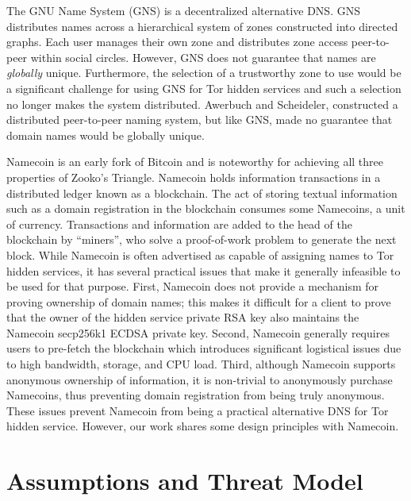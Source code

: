 \documentclass[conference]{IEEEtran}
\begin{document}
The GNU Name System\cite{wachs2014censorship} (GNS) is a decentralized alternative DNS. GNS distributes names across a hierarchical system of zones constructed into directed graphs. Each user manages their own zone and distributes zone access peer-to-peer within social circles. However, GNS does not guarantee that names are \emph{globally} unique. Furthermore, the selection of a trustworthy zone to use would be a significant challenge for using GNS for Tor hidden services and such a selection no longer makes the system distributed. Awerbuch and Scheideler,\cite{awerbuch2004group} constructed a distributed peer-to-peer naming system, but like GNS, made no guarantee that domain names would be globally unique.


Namecoin\cite{NamecoinHome} is an early fork of Bitcoin\cite{nakamoto2008bitcoin} and is noteworthy for achieving all three properties of Zooko's Triangle. Namecoin holds information transactions in a distributed ledger known as a blockchain. The act of storing textual information such as a domain registration in the blockchain consumes some Namecoins, a unit of currency. Transactions and information are added to the head of the blockchain by ``miners'', who solve a proof-of-work problem to generate the next block. While Namecoin is often advertised as capable of assigning names to Tor hidden services, it has several practical issues that make it generally infeasible to be used for that purpose. First, Namecoin does not provide a mechanism for proving ownership of domain names; this makes it difficult for a client to prove that the owner of the hidden service private RSA key also maintains the Namecoin secp256k1 ECDSA private key. Second, Namecoin generally requires users to pre-fetch the blockchain which introduces significant logistical issues due to high bandwidth, storage, and CPU load. Third, although Namecoin supports anonymous ownership of information, it is non-trivial to anonymously purchase Namecoins, thus preventing domain registration from being truly anonymous. These issues prevent Namecoin from being a practical alternative DNS for Tor hidden service. However, our work shares some design principles with Namecoin.

\section{Assumptions and Threat Model}
\label{sec:threatModel}
\end{document}
